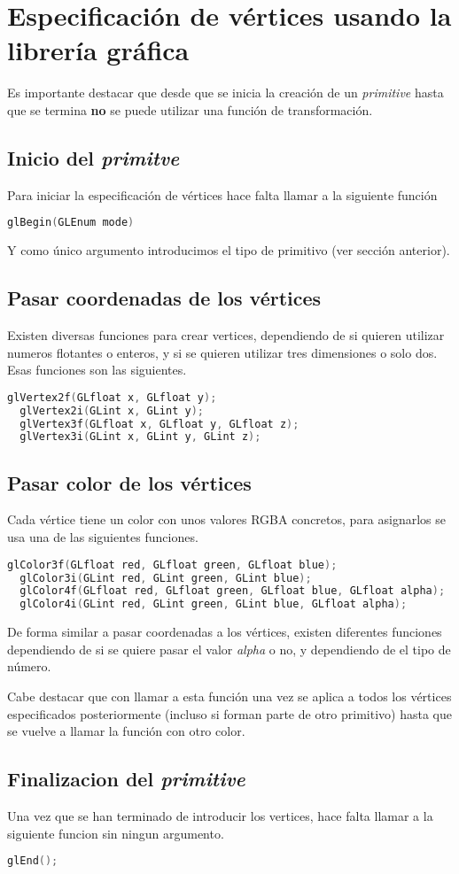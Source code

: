 \restoregeometry

\section{Especificación de vértices usando la librería gráfica}
Es importante destacar que desde que se inicia la creación de un \textit{primitive} hasta que se termina \textbf{no} se puede utilizar una función de transformación.

\subsection{Inicio del \textit{primitve}}
Para iniciar la especificación de vértices hace falta llamar a la siguiente función
\begin{lstlisting}[language=C]
  glBegin(GLEnum mode)
\end{lstlisting}
Y como único argumento introducimos el tipo de primitivo (ver sección anterior).

\subsection{Pasar coordenadas de los vértices}
Existen diversas funciones para crear vertices, dependiendo de si quieren utilizar numeros flotantes o enteros, y si se quieren utilizar tres dimensiones o solo dos. Esas funciones son las siguientes.
\begin{lstlisting}[language=C]
  glVertex2f(GLfloat x, GLfloat y);
  glVertex2i(GLint x, GLint y);
  glVertex3f(GLfloat x, GLfloat y, GLfloat z);
  glVertex3i(GLint x, GLint y, GLint z);
\end{lstlisting}

\subsection{Pasar color de los vértices}
Cada vértice tiene un color con unos valores RGBA concretos, para asignarlos se usa una de las siguientes funciones.
\begin{lstlisting}[language=C]
  glColor3f(GLfloat red, GLfloat green, GLfloat blue);
  glColor3i(GLint red, GLint green, GLint blue);
  glColor4f(GLfloat red, GLfloat green, GLfloat blue, GLfloat alpha);
  glColor4i(GLint red, GLint green, GLint blue, GLfloat alpha);
\end{lstlisting}
De forma similar a pasar coordenadas a los vértices, existen diferentes funciones dependiendo de si se quiere pasar el valor \textit{alpha} o no, y dependiendo de el tipo de número.

Cabe destacar que con llamar a esta función una vez se aplica a todos los vértices especificados posteriormente (incluso si forman parte de otro primitivo) hasta que se vuelve a llamar la función con otro color.
\subsection{Finalizacion del \textit{primitive}}
Una vez que se han terminado de introducir los vertices, hace falta llamar a la siguiente funcion sin ningun argumento.
\begin{lstlisting}[language=C]
  glEnd();
\end{lstlisting}
